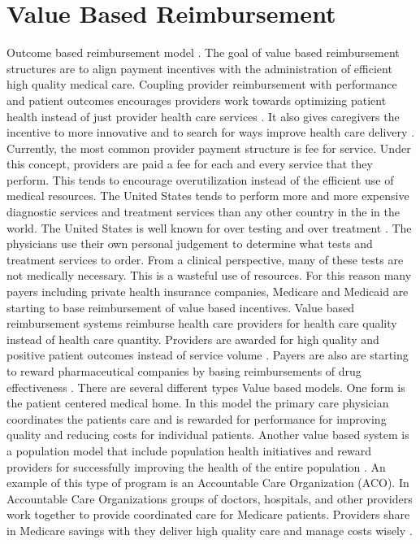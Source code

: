 \documentclass[sigconf]{acmart}
\begin{document}
\section{Value Based Reimbursement}
Outcome based reimbursement model \cite{digit}.
The goal of value based reimbursement structures are to align payment incentives with the administration of efficient high quality medical care. Coupling provider reimbursement with performance and patient outcomes encourages providers work towards optimizing patient health instead of just provider health care services . It also gives caregivers the incentive to more innovative and to search for ways improve health care delivery \cite{www-google-christian}.
Currently, the most common provider payment structure is fee for service. Under this concept, providers are paid a fee for each and every service that they perform. This tends to encourage overutilization instead of the efficient use of medical resources. The United States tends to perform more and more expensive diagnostic services and treatment services than any other country in the in the world. The United States is well known for over testing and over treatment \cite{www-google-PBSO}. The physicians use their own personal judgement to determine what tests and treatment services to order.  From a clinical perspective, many of these tests are not medically necessary. This is a wasteful use of resources. 
For this reason many payers including private health insurance companies, Medicare and Medicaid are starting to base reimbursement of value based incentives.  Value based reimbursement systems reimburse health care providers for health care quality instead of health care quantity. Providers are awarded for high quality and positive patient outcomes instead of service volume \cite{www-google-McDonald}.  Payers are also are starting to reward pharmaceutical companies by basing reimbursements of drug effectiveness \cite{www-google-McKinsey}. 
There are several different types Value based models. One form is the patient centered medical home. In this model the primary care physician coordinates the patients care and is rewarded for performance for improving quality and reducing costs for individual patients. Another value based system is a population model that include population health initiatives and reward providers for successfully improving the health of the entire population \cite{www-google-liason}. An example of this type of program is an Accountable Care Organization (ACO). In Accountable Care Organizations groups of doctors, hospitals, and other providers work together to provide coordinated care for Medicare patients. Providers share in Medicare savings with they deliver high quality care and manage costs wisely \cite{www-google-ACO}.
\end{document}
